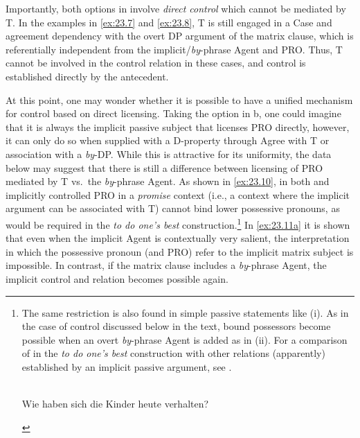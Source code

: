 \documentclass[output=paper]{langsci/langscibook}
\begin{document}
Importantly, both options in  involve \emph{direct control}
which cannot be mediated by T. In the examples in \eqref{ex:23.7} and
\eqref{ex:23.8}, T is still engaged in a Case and agreement dependency with
the overt DP argument of the matrix clause, which is referentially independent
from the implicit/\emph{by}-phrase Agent and PRO. Thus, T cannot be involved in
the control relation in these cases, and control is established directly by the
antecedent.

At this point, one may wonder whether it is possible to have a unified
mechanism for control based on direct licensing. Taking the option in
b, one could imagine that it is always the implicit passive
subject that licenses PRO directly, however, it can only do so when supplied
with a D-property through Agree with T or association with a \emph{by}-DP.
While this is attractive for its uniformity, the data below may suggest that
there is still a difference between licensing of PRO mediated by T vs.\ the
\emph{by}-phrase Agent. As shown in \eqref{ex:23.10}, in both 
and  implicitly controlled PRO in a \emph{promise} context (i.e., a
context where the implicit argument can be associated with T) cannot bind lower
possessive pronouns, as would be required in the \emph{to do one’s best}
construction.\footnote{The same restriction is also found in simple passive
    statements like (i). As in the case of control discussed below in the text,
    bound possessors become possible when an overt \emph{by}-phrase Agent is
    added as in (ii). For a comparison of  in the \emph{to do one’s
    best} construction with other  relations (apparently) established by
    an implicit passive argument, see \citet{Wurmbrand2016}.

\begin{exe}
     \\
    Wie haben sich die Kinder heute verhalten?
    \begin{xlist}
    \end{xlist}
\end{exe}} In \eqref{ex:23.11a} it is shown that even when the implicit
Agent is contextually very salient, the interpretation in which the possessive
pronoun (and PRO) refer to the implicit matrix subject is impossible. In
contrast, if the matrix clause includes a \emph{by}-phrase Agent, the implicit
control and  relation becomes possible again.\largerpage[2]
\end{document}
